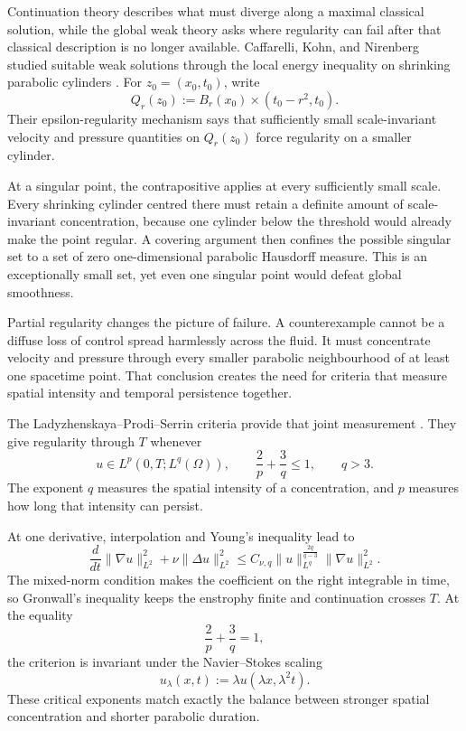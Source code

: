 
Continuation theory describes what must diverge along a maximal classical solution, while the global weak theory asks where regularity can fail after that classical description is no longer available.
Caffarelli, Kohn, and Nirenberg studied suitable weak solutions through the local energy inequality on shrinking parabolic cylinders \parencite{CaffarelliKohnNirenberg1982}.
For \(z_0=(x_0,t_0)\), write
\[
  Q_r(z_0)
  :=
  B_r(x_0)\times(t_0-r^2,t_0).
\]
Their epsilon-regularity mechanism says that sufficiently small scale-invariant velocity and pressure quantities on \(Q_r(z_0)\) force regularity on a smaller cylinder.

At a singular point, the contrapositive applies at every sufficiently small scale.
Every shrinking cylinder centred there must retain a definite amount of scale-invariant concentration, because one cylinder below the threshold would already make the point regular.
A covering argument then confines the possible singular set to a set of zero one-dimensional parabolic Hausdorff measure.
This is an exceptionally small set, yet even one singular point would defeat global smoothness.

Partial regularity changes the picture of failure.
A counterexample cannot be a diffuse loss of control spread harmlessly across the fluid.
It must concentrate velocity and pressure through every smaller parabolic neighbourhood of at least one spacetime point.
That conclusion creates the need for criteria that measure spatial intensity and temporal persistence together.


The Ladyzhenskaya--Prodi--Serrin criteria provide that joint measurement \parencite{Prodi1959,Serrin1962,Serrin1963,Ladyzhenskaya1967}.
They give regularity through \(T\) whenever
\[
  u\in L^p(0,T;L^q(\Omega)),
  \qquad
  \frac{2}{p}+\frac{3}{q}\leq1,
  \qquad
  q>3.
\]
The exponent \(q\) measures the spatial intensity of a concentration, and \(p\) measures how long that intensity can persist.

At one derivative, interpolation and Young's inequality lead to
\[
  \frac{d}{dt}\lVert\nabla u\rVert_{L^2}^{2}
  +\nu\lVert\Delta u\rVert_{L^2}^{2}
  \leq
  C_{\nu,q}
  \lVert u\rVert_{L^q}^{\frac{2q}{q-3}}
  \lVert\nabla u\rVert_{L^2}^{2}.
\]
The mixed-norm condition makes the coefficient on the right integrable in time, so Gronwall's inequality keeps the enstrophy finite and continuation crosses \(T\).
At the equality
\[
  \frac{2}{p}+\frac{3}{q}=1,
\]
the criterion is invariant under the Navier--Stokes scaling
\[
  u_\lambda(x,t)
  :=
  \lambda u(\lambda x,\lambda^2t).
\]
These critical exponents match exactly the balance between stronger spatial concentration and shorter parabolic duration.

